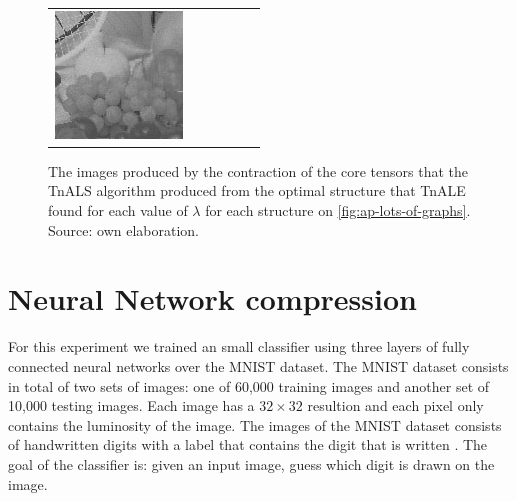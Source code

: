 \documentclass[11pt,a4paper,openright,oneside]{book}
\numberwithin{equation}{section}
\newcommand{\figref}[1]{\cref{#1}}
\begin{document}
{\begin{figure}[h]
\begin{adjustwidth}{-3cm}{-3cm}
\begin{tabular}{>{\centering\arraybackslash}m{1.5cm} m{2.5cm} m{2.5cm} m{2.5cm} m{2.5cm} m{2.5cm}}
        \includegraphics[width=\linewidth]{media/tnale/AAAfruits-comp5-ale-12.png} \\
   \end{tabular}
\end{adjustwidth}


    \caption{The images produced by the contraction of the core tensors that the TnALS algorithm
    produced from the optimal structure that TnALE found for each value of $\lambda$ for each structure on
    \figref{fig:ap-lots-of-graphs}. Source: own elaboration.}
    \label{fig:ap-lots-of-fruits}
\end{figure}


\section{Neural Network compression}
\label{sec:nn-compression}

For this experiment we trained an small classifier using three layers of
fully connected neural networks over the MNIST dataset. 
The MNIST dataset consists in total of two sets of images: one of 60,000 training images and another set of 10,000 testing images.
Each image has a $32 \times 32$ resultion and each pixel only contains the luminosity of the image. The images of the MNIST dataset
consists of handwritten digits with a label that contains
the digit that is written \cite{dengMNISTDatabaseHandwritten2012}. The goal of the classifier is: given an input image, guess which digit is drawn on the image.


}
\end{document}
